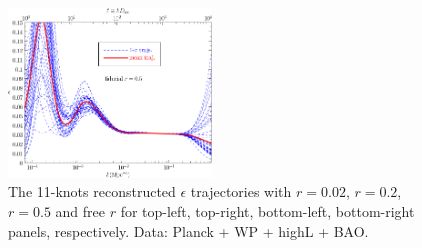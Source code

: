 \documentclass[11pt]{article}
\def \halffigwidth{0.48\textwidth}
\begin{document}
\begin{figure}
  \includegraphics[width=\halffigwidth]{nobicep_spline0_p11_r0d5_eps_traj.pdf}
  \caption{The 11-knots reconstructed $\epsilon$ trajectories with $r = 0.02$, $r=0.2$, $r=0.5$ and free $r$ for top-left, top-right, bottom-left, bottom-right panels, respectively. Data: Planck + WP + highL + BAO. \label{fig:traj_eps}}
\end{figure}
\end{document}
